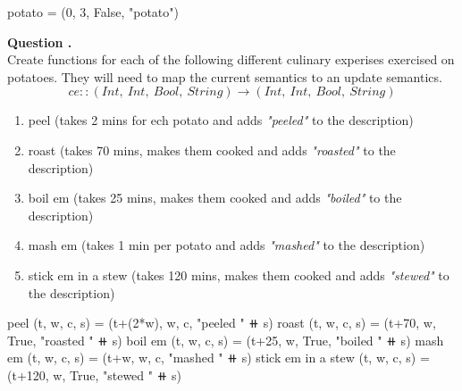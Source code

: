 \documentclass[11pt,a4paper]{article}
\begin{document}

\codesol
\ifsolutions
\begin{code}
potato = (0, 3, False, "potato")
\end{code}
\fi

\newqpart \ifquestions \textbf{Question .}\\
Create functions for each of the following different culinary experises exercised on potatoes. They will need to map the current semantics to an update semantics.
$$ce :: (Int,\ Int,\ Bool,\ String) \to (Int,\ Int,\ Bool,\ String)$$
\begin{enumerate}[label=\roman*)]
  \item peel (takes 2 mins for ech potato and adds \textit{"peeled"} to the description)
  \item roast (takes 70 mins, makes them cooked and adds \textit{"roasted"} to the description)
  \item boil em (takes 25 mins, makes them cooked and adds \textit{"boiled"} to the description)
  \item mash em (takes 1 min per potato and adds \textit{"mashed"} to the description)
  \item stick em in a stew (takes 120 mins, makes them cooked and adds \textit{"stewed"} to the description)
\end{enumerate}
\fi

\codesol
\ifsolutions
\begin{code}
peel (t, w, c, s)               = (t+(2*w), w, c, "peeled " $\doubleplus$ s)
roast (t, w, c, s)              = (t+70, w, True, "roasted " $\doubleplus$ s)
boil em (t, w, c, s)            = (t+25, w, True, "boiled " $\doubleplus$ s)
mash em (t, w, c, s)            = (t+w, w, c, "mashed " $\doubleplus$ s)
stick em in a stew (t, w, c, s) = (t+120, w, True, "stewed " $\doubleplus$ s)
\end{code}
\fi

\end{document}
